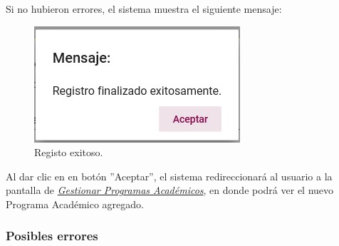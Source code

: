         Si no hubieron errores, el sistema muestra el siguiente mensaje:

        \begin{figure}[!hbtp]
            \centering
            \hypertarget{exito}{\includegraphics[width=0.7\linewidth]{images/SP3/Exitoso}}
            \caption{Registo exitoso.}
            \label{exito}
        \end{figure}

        Al dar clic en en botón ''Aceptar'', el sistema redireccionará al usuario a la pantalla de \hyperlink{consultarpa}{\textit{Gestionar Programas Académicos}}, en donde podrá ver el nuevo Programa Académico agregado.\\


        \subsubsection{Posibles errores}

